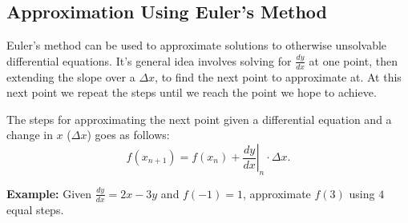 \documentclass[12pt]{article}
\begin{document}
\subsection{Approximation Using Euler's Method}
Euler's method can be used to approximate solutions to otherwise unsolvable differential equations. It's general idea involves solving for $\frac{dy}{dx}$ at one point, then extending the slope over a $\Delta x$, to find the next point to approximate at. At this next point we repeat the steps until we reach the point we hope to achieve.

The steps for approximating the next point given a differential equation and a change in $x$ ($\Delta x$) goes as follows:
\[ f(x_{n+1}) = f(x_n) + \left. \frac{dy}{dx} \right \vert_n \cdot \Delta x. \]

\noindent \textbf{Example:} Given $\frac{dy}{dx} = 2x-3y$ and $f(-1) = 1$, approximate $f(3)$ using $4$ equal steps.
\end{document}
